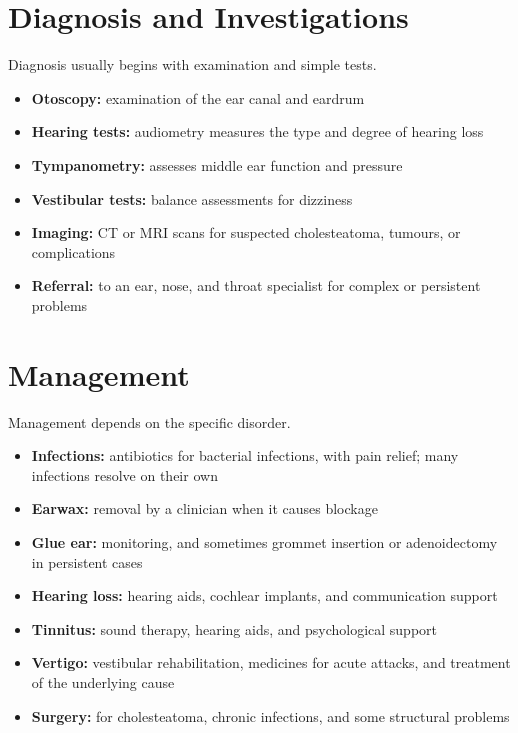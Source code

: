 \section*{Diagnosis and Investigations}
Diagnosis usually begins with examination and simple tests.
\begin{itemize}
    \item \textbf{Otoscopy:} examination of the ear canal and eardrum
    \item \textbf{Hearing tests:} audiometry measures the type and degree of hearing loss
    \item \textbf{Tympanometry:} assesses middle ear function and pressure
    \item \textbf{Vestibular tests:} balance assessments for dizziness
    \item \textbf{Imaging:} CT or MRI scans for suspected cholesteatoma, tumours, or complications
    \item \textbf{Referral:} to an ear, nose, and throat specialist for complex or persistent problems
\end{itemize}

\section*{Management}
Management depends on the specific disorder.
\begin{itemize}
    \item \textbf{Infections:} antibiotics for bacterial infections, with pain relief; many infections resolve on their own
    \item \textbf{Earwax:} removal by a clinician when it causes blockage
    \item \textbf{Glue ear:} monitoring, and sometimes grommet insertion or adenoidectomy in persistent cases
    \item \textbf{Hearing loss:} hearing aids, cochlear implants, and communication support
    \item \textbf{Tinnitus:} sound therapy, hearing aids, and psychological support
    \item \textbf{Vertigo:} vestibular rehabilitation, medicines for acute attacks, and treatment of the underlying cause
    \item \textbf{Surgery:} for cholesteatoma, chronic infections, and some structural problems
\end{itemize}

